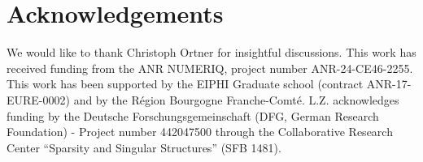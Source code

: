 \documentclass{article}
\numberwithin{equation}{section}
\begin{document}
\section*{Acknowledgements}

We would like to thank Christoph Ortner for insightful discussions. 
This work has received funding from the ANR NUMERIQ, project number ANR-24-CE46-2255. 
This work has been supported by the EIPHI Graduate school (contract ANR-17-EURE-0002) and by the Région Bourgogne Franche-Comté.
L.Z. acknowledges funding by  the Deutsche Forschungsgemeinschaft (DFG, German Research Foundation) - Project number 442047500 through the Collaborative Research Center “Sparsity and Singular Structures” (SFB 1481). 




\appendix
\end{document}
